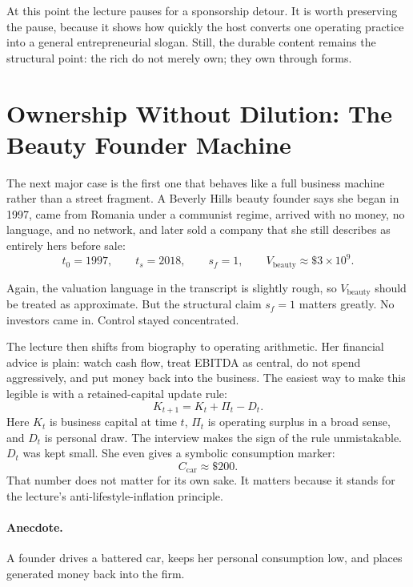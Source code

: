 At this point the lecture pauses for a sponsorship detour. It is worth preserving the pause, because it shows how quickly the host converts one operating practice into a general entrepreneurial slogan. Still, the durable content remains the structural point: the rich do not merely own; they own through forms.

\section{Ownership Without Dilution: The Beauty Founder Machine}

The next major case is the first one that behaves like a full business machine rather than a street fragment. A Beverly Hills beauty founder says she began in 1997, came from Romania under a communist regime, arrived with no money, no language, and no network, and later sold a company that she still describes as entirely hers before sale:
\begin{equation}
t_0 = 1997,\qquad t_s = 2018,\qquad s_f = 1,\qquad V_{\mathrm{beauty}} \approx \$3 \times 10^{9}.
\end{equation}

Again, the valuation language in the transcript is slightly rough, so \(V_{\mathrm{beauty}}\) should be treated as approximate. But the structural claim \(s_f=1\) matters greatly. No investors came in. Control stayed concentrated.

The lecture then shifts from biography to operating arithmetic. Her financial advice is plain: watch cash flow, treat EBITDA as central, do not spend aggressively, and put money back into the business. The easiest way to make this legible is with a retained-capital update rule:
\begin{equation}
K_{t+1} = K_t + \Pi_t - D_t.
\end{equation}
Here \(K_t\) is business capital at time \(t\), \(\Pi_t\) is operating surplus in a broad sense, and \(D_t\) is personal draw. The interview makes the sign of the rule unmistakable. \(D_t\) was kept small. She even gives a symbolic consumption marker:
\begin{equation}
C_{\mathrm{car}} \approx \$200.
\end{equation}
That number does not matter for its own sake. It matters because it stands for the lecture's anti-lifestyle-inflation principle.

\paragraph{Anecdote.} A founder drives a battered car, keeps her personal consumption low, and places generated money back into the firm.

